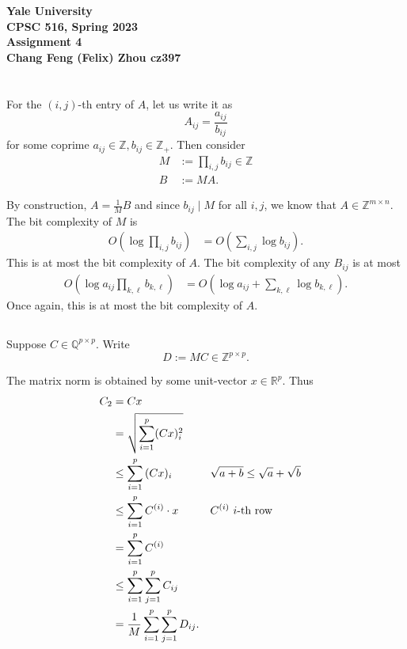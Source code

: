 \documentclass[10pt]{article}
\let\abs\relax
\DeclarePairedDelimiter{\abs}{\lvert}{\rvert}
\let\norm\relax
\DeclarePairedDelimiter{\norm}{\lVert}{\rVert}
\newcommand{\R}{\mathbb{R}}
\newcommand{\Z}{\mathbb{Z}}
\newcommand{\Q}{\mathbb{Q}}
\begin{document}
\begin{center}
    {\Large\textbf{Yale University}}\\
    \vspace{3mm}
    {\Large\textbf{CPSC 516, Spring 2023}}\\
    \vspace{2mm}
    {\Large\textbf{Assignment 4}}\\
    \vspace{3mm}
    \textbf{Chang Feng (Felix) Zhou cz397}
\end{center}

\section{}
\subsection{}
For the $(i, j)$-th entry of $A$,
let us write it as
\[
  A_{ij} = \frac{a_{ij}}{b_{ij}}
\]
for some coprime $a_{ij}\in \Z, b_{ij}\in \Z_+$.
Then consider
\begin{align*}
  M &:= \prod_{i, j} b_{ij}\in \Z \\
  B &:= MA.
\end{align*}

By construction,
$A = \frac1M B$
and since $b_{ij}\mid M$ for all $i, j$,
we know that $A\in \Z^{m\times n}$.
The bit complexity of $M$ is
\begin{align*}
  O\left( \log \prod_{i, j} b_{ij} \right)
  &= O\left( \sum_{i, j} \log b_{ij} \right).
\end{align*}
This is at most the bit complexity of $A$.
The bit complexity of any $B_{ij}$ is at most
\begin{align*}
  O\left( \log a_{ij} \prod_{k, \ell} b_{k, \ell} \right)
  &= O\left( \log a_{ij} + \sum_{k, \ell} \log b_{k, \ell} \right).
\end{align*}
Once again,
this is at most the bit complexity of $A$.

\subsection{}
Suppose $C\in \Q^{p\times p}$.
Write
\[
  D := M C\in \Z^{p\times p}.
\]

The matrix norm is obtained by some unit-vector $x\in \R^p$.
Thus
\begin{align*}
  \norm{C}_2
  &= \norm{Cx} \\
  &= \sqrt{\sum_{i=1}^p (Cx)_i^2} \\
  &\leq \sum_{i=1}^p \abs{(Cx)_i} &&\sqrt{a+b}\leq \sqrt a + \sqrt b \\
  &\leq \sum_{i=1}^p \norm{C^{(i)}}\cdot \norm{x} &&\text{$C^{(i)}$ $i$-th row} \\
  &= \sum_{i=1}^p \norm{C^{(i)}} \\
  &\leq \sum_{i=1}^p \sum_{j=1}^p \abs{C_{ij}} \\
  &= \frac1M \sum_{i=1}^p \sum_{j=1}^p \abs{D_{ij}}.
\end{align*}
\end{document}
